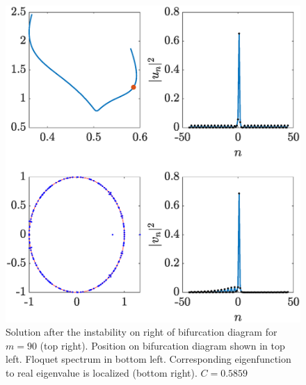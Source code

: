 \documentclass{article}
\begin{document}
\begin{figure}[H]
    \centering
    \includegraphics[width=12cm]{rightafterinstabilityR}
    \caption{Solution after the instability on right of bifurcation diagram for $m=90$ (top right). Position on bifurcation diagram shown in top left. Floquet spectrum in bottom left. Corresponding eigenfunction to real eigenvalue is localized (bottom right). $C = 0.5859$}
    \label{fig:rightinstabR}
\end{figure}
\end{document}
